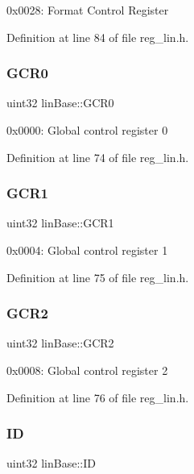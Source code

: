 0x0028\+: Format Control Register 

Definition at line 84 of file reg\+\_\+lin.\+h.

\mbox{\label{structlinBase_a1d322e930c882cb11e5f68b630c9777e}} 
\subsubsection{\texorpdfstring{G\+C\+R0}{GCR0}}
{\footnotesize\ttfamily uint32 lin\+Base\+::\+G\+C\+R0}

0x0000\+: Global control register 0 

Definition at line 74 of file reg\+\_\+lin.\+h.

\mbox{\label{structlinBase_a17ba37142670bab5388a4e9710aeb0cc}} 
\subsubsection{\texorpdfstring{G\+C\+R1}{GCR1}}
{\footnotesize\ttfamily uint32 lin\+Base\+::\+G\+C\+R1}

0x0004\+: Global control register 1 

Definition at line 75 of file reg\+\_\+lin.\+h.

\mbox{\label{structlinBase_a91b69bb454fbdfc4d4b91e08f81c6349}} 
\subsubsection{\texorpdfstring{G\+C\+R2}{GCR2}}
{\footnotesize\ttfamily uint32 lin\+Base\+::\+G\+C\+R2}

0x0008\+: Global control register 2 

Definition at line 76 of file reg\+\_\+lin.\+h.

\mbox{\label{structlinBase_afea4820b8b7306cb7afeac41a4adf439}} 
\subsubsection{\texorpdfstring{ID}{ID}}
{\footnotesize\ttfamily uint32 lin\+Base\+::\+ID}

